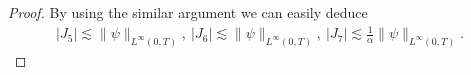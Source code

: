 \documentclass[reqno,a4paper,11pt]{amsart}
\theoremstyle{plain}
\numberwithin{equation}{section}
\newcommand{\abs}[1]{\left\vert #1 \right \vert}
\begin{document}
\begin{proof}
				By using the similar argument we can easily deduce
				\begin{align}
					\label{lemh55-10}
					|J_{5}|\lesssim \|\psi\|_{L^{\infty}(0,T)},\ |J_{6}|\lesssim \|\psi\|_{L^{\infty}(0,T)},\ |J_{7}|\lesssim \frac{1}{\alpha}\|\psi\|_{L^{\infty}(0,T)}.
				\end{align}
				

\end{proof}
\end{document}
